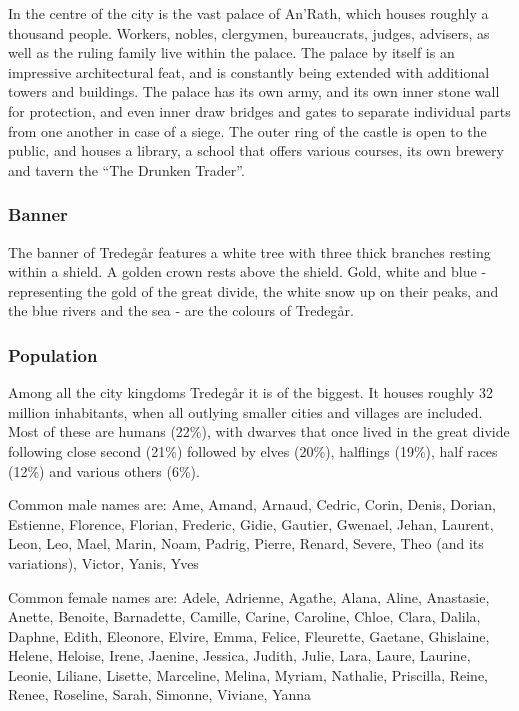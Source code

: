 In the centre of the city is the vast palace of An'Rath, which houses roughly
a thousand people. Workers, nobles, clergymen, bureaucrats, judges, advisers,
as well as the ruling family live within the palace. The palace by itself is
an impressive architectural feat, and is constantly being extended with
additional towers and buildings. The palace has its own army, and its own
inner stone wall for protection, and even inner draw bridges and gates to
separate individual parts from one another in case of a siege. The outer ring
of the castle is open to the public, and houses a library, a school that
offers various courses, its own brewery and tavern the ``The Drunken Trader''.

\subsubsection{Banner}

The banner of Tredegår features a white tree with three thick branches resting
within a shield. A golden crown rests above the shield. Gold, white and blue -
representing the gold of the great divide, the white snow up on their peaks,
and the blue rivers and the sea - are the colours of Tredegår.

\subsubsection{Population}

Among all the city kingdoms Tredegår it is of the biggest. It houses roughly
32 million inhabitants, when all outlying smaller cities and villages are
included. Most of these are humans (22\%), with dwarves that once lived in the
great divide following close second (21\%) followed by elves (20\%), halflings
(19\%), half races (12\%) and various others (6\%).

Common male names are: Ame, Amand, Arnaud, Cedric, Corin, Denis, Dorian,
Estienne, Florence, Florian, Frederic, Gidie, Gautier, Gwenael, Jehan, Laurent,
Leon, Leo, Mael, Marin, Noam, Padrig, Pierre, Renard, Severe, Theo (and its
variations), Victor, Yanis, Yves

Common female names are: Adele, Adrienne, Agathe, Alana, Aline, Anastasie,
Anette, Benoite, Barnadette, Camille, Carine, Caroline, Chloe, Clara, Dalila,
Daphne, Edith, Eleonore, Elvire, Emma, Felice, Fleurette, Gaetane, Ghislaine,
Helene, Heloise, Irene, Jaenine, Jessica, Judith, Julie, Lara, Laure, Laurine,
Leonie, Liliane, Lisette, Marceline, Melina, Myriam, Nathalie, Priscilla, Reine,
Renee, Roseline, Sarah, Simonne, Viviane, Yanna


